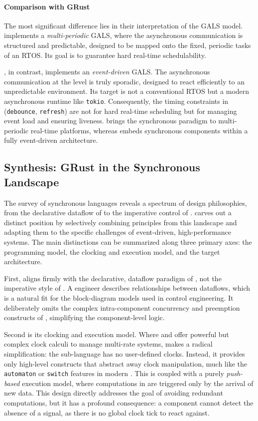 \paragraph*{Comparison with GRust}
The most significant difference lies in their interpretation of the GALS model. \Prelude implements
a \emph{multi-periodic} GALS, where the asynchronous communication is structured and predictable,
designed to be mapped onto the fixed, periodic tasks of an RTOS. Its goal is to guarantee hard
real-time schedulability.

\GRust, in contrast, implements an \emph{event-driven} GALS. The asynchronous communication at the
\GRFRP level is truly sporadic, designed to react efficiently to an unpredictable environment. Its
target is not a conventional RTOS but a modern asynchronous runtime like \texttt{tokio}.
Consequently, the timing constraints in \GRust (\eg \texttt{debounce}, \texttt{refresh}) are not for
hard real-time scheduling but for managing event load and ensuring liveness. \Prelude brings the
synchronous paradigm to multi-periodic real-time platforms, whereas \GRust embeds synchronous
components within a fully event-driven architecture.

\subsection{Synthesis: GRust in the Synchronous Landscape}
\label{sec:sota:synchronous:synthesis}

The survey of synchronous languages reveals a spectrum of design philosophies, from the declarative
dataflow of \Lustre to the imperative control of \Esterel. \GRust carves out a distinct position by
selectively combining principles from this landscape and adapting them to the specific challenges of
event-driven, high-performance systems. The main distinctions can be summarized along three primary
axes: the programming model, the clocking and execution model, and the target architecture.

First, \GRust aligns firmly with the declarative, dataflow paradigm of \Lustre, not the imperative
style of \Esterel. A \GRust engineer describes relationships between dataflows, which is a natural
fit for the block-diagram models used in control engineering. It deliberately omits the complex
intra-component concurrency and preemption constructs of \Esterel, simplifying the component-level
logic.

Second is its clocking and execution model. Where \Lustre and \Signal offer powerful but complex
clock calculi to manage multi-rate systems, \GRust makes a radical simplification: the \GRSync
sub-language has no user-defined clocks. Instead, it provides only high-level constructs that abstract
away clock manipulation, much like the \texttt{automaton} or \texttt{switch} features in modern
\Lustre. This is coupled with a purely \emph{push-based} execution model, where computations in
\GRFRP are triggered only by the arrival of new data. This design directly addresses the goal of
avoiding redundant computations, but it has a profound consequence: a \GRust component cannot
detect the absence of a signal, as there is no global clock tick to react against.

